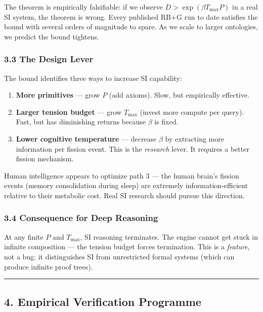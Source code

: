\documentclass[
  11pt,
  a4paper,
]{article}
\providecommand{\tightlist}{%
  \setlength{\itemsep}{0pt}\setlength{\parskip}{0pt}}
\begin{document}
The theorem is empirically falsifiable: if we observe
\(D > \exp(\beta T_\text{max} P)\) in a real SI system, the theorem is
wrong. Every published RB+G run to date satisfies the bound with several
orders of magnitude to spare. As we scale to larger ontologies, we
predict the bound tightens.

\subsubsection{3.3 The Design Lever}\label{the-design-lever}

The bound identifies three ways to increase SI capability:

\begin{enumerate}
\def\labelenumi{\arabic{enumi}.}
\tightlist
\item
  \textbf{More primitives} --- grow \(P\) (add axioms). Slow, but
  empirically effective.
\item
  \textbf{Larger tension budget} --- grow \(T_\text{max}\) (invest more
  compute per query). Fast, but has diminishing returns because
  \(\beta\) is fixed.
\item
  \textbf{Lower cognitive temperature} --- decrease \(\beta\) by
  extracting more information per fission event. This is the
  \emph{research} lever. It requires a better fission mechanism.
\end{enumerate}

Human intelligence appears to optimize path 3 --- the human brain's
fission events (memory consolidation during sleep) are extremely
information-efficient relative to their metabolic cost. Real SI research
should pursue this direction.

\subsubsection{3.4 Consequence for Deep
Reasoning}\label{consequence-for-deep-reasoning}

At any finite \(P\) and \(T_\text{max}\), SI reasoning terminates. The
engine cannot get stuck in infinite composition --- the tension budget
forces termination. This is a \emph{feature}, not a bug: it
distinguishes SI from unrestricted formal systems (which can produce
infinite proof trees).

\begin{center}\rule{0.5\linewidth}{0.5pt}\end{center}

\subsection{4. Empirical Verification
Programme}\label{empirical-verification-programme}
\end{document}
